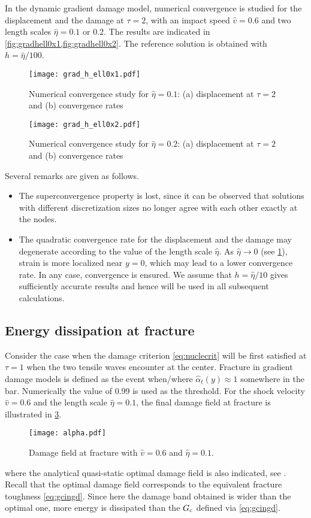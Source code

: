 In the dynamic gradient damage model, numerical convergence is studied for the displacement and the damage at $\tau=2$, with an impact speed $\widehat{v}=0.6$ and two length scales $\widehat{\eta}=0.1$ or $0.2$. The results are indicated in \cref{fig:gradhell0x1,fig:gradhell0x2}. The reference solution is obtained with $h=\widehat{\eta}/100$.
\begin{figure}[htbp]
\texttt{[image: grad\_h\_ell0x1.pdf]}
\caption{Numerical convergence study for $\widehat{\eta}=0.1$: (a) displacement at $\tau=2$ and (b) convergence rates} \label{fig:gradhell0x1}
\end{figure}
\begin{figure}[htbp]
\texttt{[image: grad\_h\_ell0x2.pdf]}
\caption{Numerical convergence study for $\widehat{\eta}=0.2$: (a) displacement at $\tau=2$ and (b) convergence rates} \label{fig:gradhell0x2}
\end{figure}
Several remarks are given as follows.
\begin{itemize}
\item The superconvergence property is lost, since it can be observed that solutions with different discretization sizes no longer agree with each other exactly at the nodes.
\item The quadratic convergence rate for the displacement and the damage may degenerate according to the value of the length scale $\widehat{\eta}$. As $\widehat{\eta}\to 0$ (see \cref{fig:gradhell0x1}), strain is more localized near $y=0$, which may lead to a lower convergence rate. In any case, convergence is ensured. We assume that $h=\widehat{\eta}/10$ gives sufficiently accurate results and hence will be used in all subsequent calculations.
\end{itemize}

\subsection{Energy dissipation at fracture}
Consider the case when the damage criterion \eqref{eq:nuclecrit} will be first satisfied at $\tau=1$ when the two tensile waves encounter at the center. Fracture in gradient damage models is defined as the event when/where $\widehat{\alpha}_t(y)\approx 1$ somewhere in the bar. Numerically the value of 0.99 is used as the threshold. For the shock velocity $\widehat{v}=0.6$ and the length scale $\widehat{\eta}=0.1$, the final damage field at fracture is illustrated in \cref{fig:alphatf}.
\begin{figure}[htbp]
\centering
\texttt{[image: alpha.pdf]}
\caption{Damage field at fracture with $\widehat{v}=0.6$ and $\widehat{\eta}=0.1$.} \label{fig:alphatf}
\end{figure}
where the analytical quasi-static optimal damage field is also indicated, see \cite{PhamAmorMarigoMaurini:2011}. Recall that the optimal damage field corresponds to the equivalent fracture toughness \eqref{eq:gcingd}. Since here the damage band obtained is wider than the optimal one, more energy is dissipated than the $G_\mathrm{c}$ defined via \eqref{eq:gcingd}.

